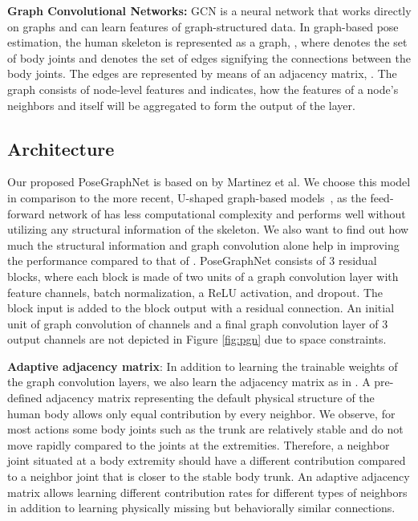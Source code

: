 \documentclass{article}
\begin{document}
\textbf{Graph Convolutional Networks:} GCN is a neural network that works directly on graphs and can learn features of graph-structured data.
In graph-based pose estimation, the human skeleton is represented as a graph, , where  denotes the set of  body joints and  denotes the set of edges signifying the connections between the body joints. The edges are represented by means of an adjacency matrix, .
The graph consists of node-level features and  indicates, how the features of a node's neighbors and itself will be aggregated to form the output of the layer.

\subsection{Architecture}
\label{sec:archi}
Our proposed PoseGraphNet is based on \cite{Martinez2017} by Martinez et al. 
We choose this model in comparison to the more recent, U-shaped graph-based models~\cite{Cai2019,Doosti2020}, as the feed-forward network of \cite{Martinez2017} has less computational complexity and performs well without utilizing any structural information of the skeleton. 
We also want to find out how much the structural information and graph convolution alone help in improving the performance compared to that of \cite{Martinez2017}.
PoseGraphNet consists of 3 residual blocks, where each block is made of two units of a graph convolution layer with  feature channels, batch normalization, a ReLU activation, and dropout. The block input is added to the block output with a residual connection.
An initial unit of graph convolution of  channels and a final graph convolution layer of 3 output channels are not depicted in Figure \ref{fig:pgn} due to space constraints.

\textbf{Adaptive adjacency matrix}: In addition to learning the trainable weights of the graph convolution layers, we also learn the adjacency matrix as in \cite{Doosti2020}.
A pre-defined adjacency matrix  representing the default physical structure of the human body
allows only equal contribution by every neighbor.
We observe, for most actions some body joints such as the trunk are relatively stable and do not move rapidly compared to the joints at the extremities.
Therefore, a neighbor joint situated at a body extremity should have a different contribution compared to a neighbor joint that is closer to the stable body trunk.
An adaptive adjacency matrix allows learning different contribution rates for different types of neighbors in addition to learning physically missing but behaviorally similar connections.
\end{document}
